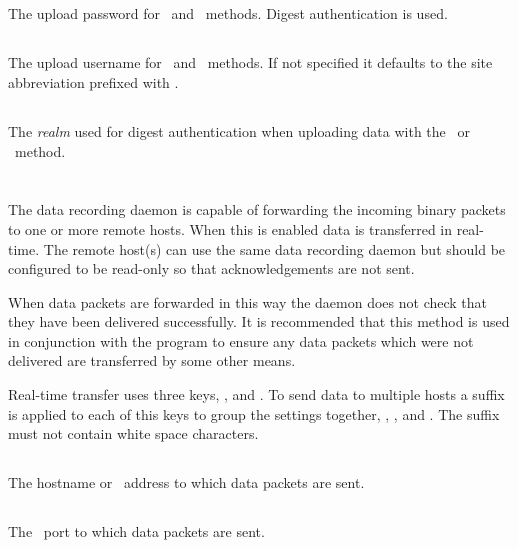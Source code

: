 \subsection{}
The upload password for \http\ and \https\ methods. Digest
authentication is used.

\subsection{}
The upload username for \http\ and \https\ methods. If not specified
it defaults to the site abbreviation prefixed with .

\subsection{}
The \emph{realm} used for digest authentication when uploading data
with the \http\ or \https\ method.

\section{}

The data recording daemon is capable of forwarding the incoming binary
packets to one or more remote hosts. When this is enabled data is
transferred in real-time. The remote host(s) can use the same data
recording daemon but should be configured to be read-only so that
acknowledgements are not sent.

When data packets are forwarded in this way the daemon does not check
that they have been delivered successfully. It is recommended that
this method is used in conjunction with the 
program to ensure any data packets which were not delivered are
transferred by some other means.

Real-time transfer uses three keys, ,
 and . To send data to multiple
hosts a suffix is applied to each of this keys to group the settings
together, \eg, ,  and
. The suffix must not contain white space characters.

\subsection{}
The hostname or \ip\ address to which data packets are sent.

\subsection{}
The \udp\ port to which data packets are sent.

